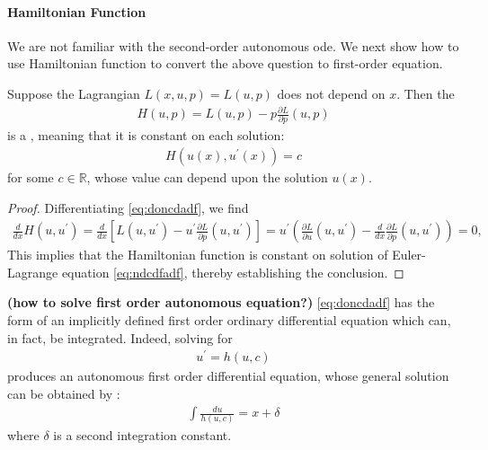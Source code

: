 \documentclass{article}
\newcommand{\bfs}[1]{\textbf{({#1}) }}
\begin{document}
\paragraph{Hamiltonian Function}
We are not familiar with the second-order autonomous ode. We next show how to use Hamiltonian function to convert the above question to first-order equation.
\begin{thma}
Suppose the Lagrangian $L(x, u, p)=L(u, p)$ does not depend on $x$. Then the 
\begin{align}
H(u, p)=L(u, p)-p \frac{\partial L}{\partial p}(u, p)\label{eq:doncdadf}
\end{align}
is a , meaning that it is constant on each solution:
\begin{align}
H\left(u(x), u^{\prime}(x)\right)=c\label{eq:xcadfda}
\end{align}
for some $c \in \mathbb{R}$, whose value can depend upon the solution $u(x)$.
\end{thma}
\begin{proof}
Differentiating \cref{eq:doncdadf}, we find
\begin{align*}
\frac{d}{d x} H\left(u, u^{\prime}\right)=\frac{d}{d x}\left[L\left(u, u^{\prime}\right)-u^{\prime} \frac{\partial L}{\partial p}\left(u, u^{\prime}\right)\right]=u^{\prime}\left(\frac{\partial L}{\partial u}\left(u, u^{\prime}\right)-\frac{d}{d x} \frac{\partial L}{\partial p}\left(u, u^{\prime}\right)\right)=0,
\end{align*}
This implies that the Hamiltonian function is constant on solution of Euler-Lagrange equation \cref{eq:ndcdfadf}, thereby establishing the conclusion.
\end{proof}
\begin{rema}\bfs{how to solve first order autonomous equation?}
\cref{eq:doncdadf} has the form of an implicitly defined first order ordinary differential equation which can, in fact, be integrated. Indeed, solving for
\begin{align*}
u^{\prime}=h(u, c)
\end{align*}
produces an autonomous first order differential equation, whose general solution can be obtained by :
\begin{align*}
\int \frac{d u}{h(u, c)}=x+\delta
\end{align*}
where $\delta$ is a second integration constant.
\end{rema}
\end{document}

